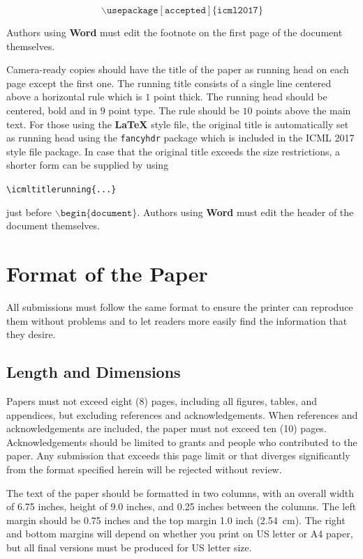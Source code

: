 \documentclass{article}
\begin{document}
$$\mathtt{\backslash usepackage[accepted]\{icml2017\}}$$

\noindent
Authors using \textbf{Word} must edit the
footnote on the first page of the document themselves.

Camera-ready copies should have the title of the paper as running head
on each page except the first one.  The running title consists of a
single line centered above a horizontal rule which is $1$ point thick.
The running head should be centered, bold and in $9$ point type.  The
rule should be $10$ points above the main text.  For those using the
\textbf{\LaTeX} style file, the original title is automatically set as running
head using the {\tt fancyhdr} package which is included in the ICML
2017 style file package.  In case that the original title exceeds the
size restrictions, a shorter form can be supplied by using

\verb|\icmltitlerunning{...}|

just before $\mathtt{\backslash begin\{document\}}$.
Authors using \textbf{Word} must edit the header of the document themselves.

\section{Format of the Paper} 
 
All submissions must follow the same format to ensure the printer can
reproduce them without problems and to let readers more easily find
the information that they desire.

\subsection{Length and Dimensions}

Papers must not exceed eight (8) pages, including all figures, tables,
and appendices, but excluding references and acknowledgements. When references and acknowledgements are included,
the paper must not exceed ten (10) pages.
Acknowledgements should be limited to grants and people who contributed to the paper.
Any submission that exceeds 
this page limit or that diverges significantly from the format specified 
herein will be rejected without review.

The text of the paper should be formatted in two columns, with an
overall width of 6.75 inches, height of 9.0 inches, and 0.25 inches
between the columns. The left margin should be 0.75 inches and the top
margin 1.0 inch (2.54~cm). The right and bottom margins will depend on
whether you print on US letter or A4 paper, but all final versions
must be produced for US letter size.
\end{document}
